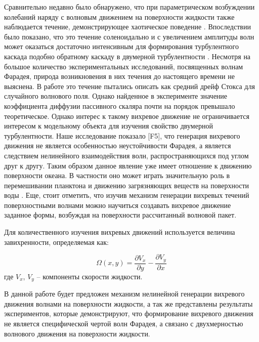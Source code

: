 Сравнительно недавно было обнаружено, что при параметрическом возбуждении колебаний наряду с волновым движением на поверхности жидкости также наблюдается течение, демонстрирующее хаотическое поведение \cite{Ramshankar1990}. Впоследствии было показано, что это течение соленоидально и с увеличением амплитуды волн может оказаться достаточно интенсивным для формирования турбулентного каскада \cite{VonKameke2011, Francois2014, Francois2013} подобно обратному каскаду в двумерной турбулентности \cite{Kraichnan1967}. Несмотря на большое количество экспериментальных исследований, посвященных волнам Фарадея, природа возникновения в них течения до настоящего времени не выяснена. В работе \cite{Mesquita1992} это течение пытались описать как средний дрейф Стокса \cite{Stokes1847} для случайного волнового поля. Однако найденное в эксперименте значение коэффициента диффузии пассивного скаляра почти на порядок превышало теоретическое.	
	Однако интерес к такому вихревое движение не ограничивается интересом к модельному объекта для изучения свойство двумерной турбулентности.
	 Наше исследование показало [F5], что генерация вихревого движения не является особенностью неустойчивости Фарадея, а является следствием нелинейного взаимодействия волн, распространяющихся под углом друг к другу. Таким образом данное явление уже имеет отношение к движению поверхности океана. В частности оно может играть значительную роль в перемешивании планктона и движению загрязняющих веществ на поверхности воды \cite{Falkovich2009}.
	Еще, стоит отметить, что изучив механизм генерации вихревых течений поверхностными волнами можно научиться создавать вихревое движение заданное формы, возбуждая на поверхности рассчитанный волновой пакет.
	
Для количественного изучения вихревых движений используется величина завихренности, определяемая как:

\begin{equation}
 \label{eq:defVort}
\Omega(x, y) = \frac{\partial V_x}{\partial y} - \frac{\partial V_y}{\partial x}
\end{equation}
где $V_x$, $V_y$ – компоненты скорости жидкости. 



В данной работе будет предложен механизм нелинейной генерации вихревого движения волнами на поверхности жидкости, а так же представлены результаты экспериментов, которые демонстрируют, что формирование вихревого движения не является специфической чертой волн Фарадея, а связано с двухмерностью волнового движения на поверхности жидкости.



